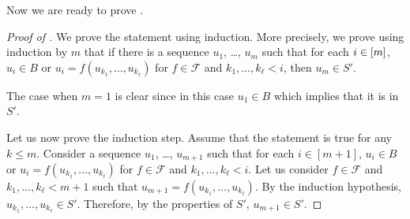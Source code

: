 Now we are ready to prove .
\begin{proof}[Proof of ]
    We prove the statement using induction. More precisely, we prove using
    induction by $m$ that if there is a sequence
    $u_1$, \dots, $u_m$ such that
    for each $i \in {[{m}]}$, $u_i \in B$ or $u_i = f(u_{k_1}, \dots, u_{k_\ell})$
    for $f \in \mathcal{F}$ and $k_1, \dots, k_\ell < i$, then $u_m \in S'$.

    The case when $m = 1$ is clear since in this case $u_1 \in B$ which implies
    that it is in $S'$.

    Let us now prove the induction step. Assume that the statement is true for any
    $k \le m$. Consider a sequence $u_1$, \dots, $u_{m + 1}$ such that
    for each $i \in [m + 1]$,
    $u_i \in B$ or $u_i = f(u_{k_1}, \dots, u_{k_\ell})$
    for $f \in \mathcal{F}$ and $k_1, \dots, k_\ell < i$. Let us consider
    $f \in \mathcal{F}$ and $k_1, \dots, k_\ell < m + 1$ such that
    $u_{m + 1} = f(u_{k_1}, \dots, u_{k_\ell})$. By the induction hypothesis,
    $u_{k_1}, \dots, u_{k_\ell} \in S'$. Therefore, by the properties of $S'$,
    $u_{m + 1} \in S'$.
\end{proof}

